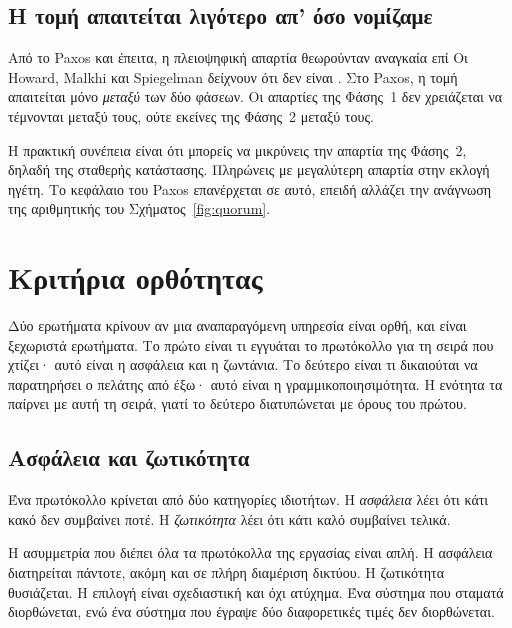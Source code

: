 \subsection{Η τομή απαιτείται λιγότερο απ' όσο νομίζαμε}

Από το Paxos και έπειτα, η πλειοψηφική απαρτία θεωρούνταν αναγκαία επί
Οι Howard, Malkhi και Spiegelman δείχνουν ότι
δεν είναι \cite{howard2016flexiblepaxos}. Στο Paxos, η τομή απαιτείται
μόνο \emph{μεταξύ} των δύο φάσεων. Οι απαρτίες της Φάσης~1 δεν
χρειάζεται να τέμνονται μεταξύ τους, ούτε εκείνες της Φάσης~2 μεταξύ
τους.

Η πρακτική συνέπεια είναι ότι μπορείς να μικρύνεις την απαρτία της
Φάσης~2, δηλαδή της σταθερής κατάστασης. Πληρώνεις με μεγαλύτερη απαρτία
στην εκλογή ηγέτη. Το κεφάλαιο του Paxos επανέρχεται σε αυτό, επειδή
αλλάζει την ανάγνωση της αριθμητικής του Σχήματος~\ref{fig:quorum}.

\section{Κριτήρια ορθότητας}
\label{sec:correctness}

Δύο ερωτήματα κρίνουν αν μια αναπαραγόμενη υπηρεσία είναι ορθή, και
είναι ξεχωριστά ερωτήματα. Το πρώτο είναι τι εγγυάται το πρωτόκολλο για
τη σειρά που χτίζει· αυτό είναι η ασφάλεια και η ζωντάνια. Το δεύτερο
είναι τι δικαιούται να παρατηρήσει ο πελάτης από έξω· αυτό είναι η
γραμμικοποιησιμότητα. Η ενότητα τα παίρνει με αυτή τη σειρά, γιατί το
δεύτερο διατυπώνεται με όρους του πρώτου.

\subsection{Ασφάλεια και ζωτικότητα}

Ένα πρωτόκολλο κρίνεται από δύο κατηγορίες ιδιοτήτων. Η \emph{ασφάλεια}
λέει ότι κάτι κακό δεν συμβαίνει ποτέ. Η \emph{ζωτικότητα} λέει ότι κάτι
καλό συμβαίνει τελικά.

Η ασυμμετρία που διέπει όλα τα πρωτόκολλα της εργασίας είναι απλή. Η
ασφάλεια διατηρείται πάντοτε, ακόμη και σε πλήρη διαμέριση δικτύου. Η
ζωτικότητα θυσιάζεται. Η επιλογή είναι σχεδιαστική και όχι ατύχημα. Ένα
σύστημα που σταματά διορθώνεται, ενώ ένα σύστημα που έγραψε δύο
διαφορετικές τιμές δεν διορθώνεται.

